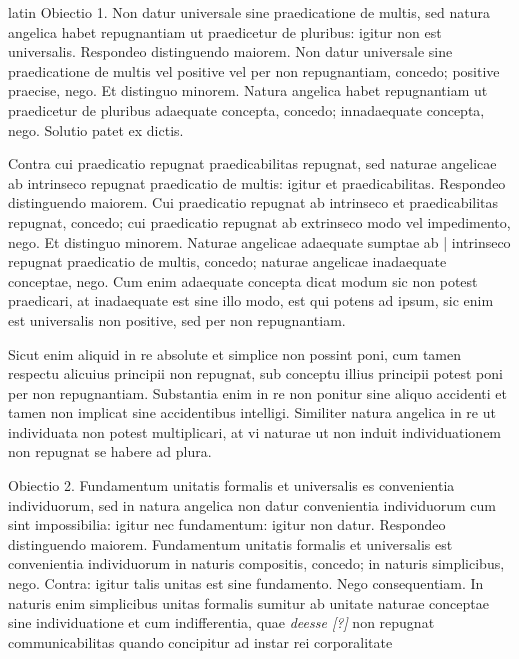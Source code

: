 \begin{otherlanguage*}{latin}
\pstart
Obiectio 1. Non datur universale sine praedicatione de multis, sed natura angelica habet repugnantiam ut praedicetur de pluribus:
igitur non est universalis. Respondeo distinguendo maiorem. Non datur universale sine praedicatione de multis vel positive vel per non repugnantiam, concedo; positive praecise, nego. Et distinguo minorem. Natura angelica habet repugnantiam ut praedicetur de pluribus adaequate concepta, concedo; innadaequate concepta, nego. Solutio patet ex dictis. 
\pend

\pstart
Contra cui praedicatio repugnat praedicabilitas repugnat, sed naturae angelicae ab intrinseco repugnat praedicatio de multis:
igitur et praedicabilitas. Respondeo distinguendo maiorem. Cui praedicatio repugnat ab intrinseco et praedicabilitas repugnat, concedo; cui praedicatio repugnat ab extrinseco modo vel impedimento, nego. Et distinguo minorem. Naturae angelicae adaequate sumptae ab \textnormal{|} intrinseco repugnat praedicatio de multis, concedo; naturae angelicae inadaequate conceptae, nego. Cum enim adaequate concepta dicat modum sic non potest praedicari, at inadaequate est sine illo modo, est qui potens ad ipsum, sic enim est universalis non positive, sed per non repugnantiam. 
\pend

\pstart
Sicut enim aliquid in re absolute et simplice non possint poni, cum tamen respectu alicuius principii non repugnat, sub conceptu illius principii potest poni per non repugnantiam. Substantia enim in re non ponitur sine aliquo accidenti et tamen non implicat sine accidentibus intelligi. Similiter natura angelica in re ut individuata non potest multiplicari, at vi naturae ut non induit individuationem non repugnat se habere ad plura. 
\pend

\pstart
Obiectio 2. Fundamentum unitatis formalis et universalis es convenientia individuorum, sed in natura angelica non datur convenientia individuorum cum sint impossibilia:
igitur nec fundamentum:
igitur non datur. Respondeo distinguendo maiorem. Fundamentum unitatis formalis et universalis est convenientia individuorum in naturis compositis, concedo; in naturis simplicibus, nego. Contra:
igitur talis unitas est sine fundamento. Nego consequentiam. In naturis enim simplicibus unitas formalis sumitur ab unitate naturae conceptae sine individuatione et cum indifferentia, quae \emph{deesse [?]} non repugnat communicabilitas quando concipitur ad instar rei corporalitate 
\pend


\end{otherlanguage*}
